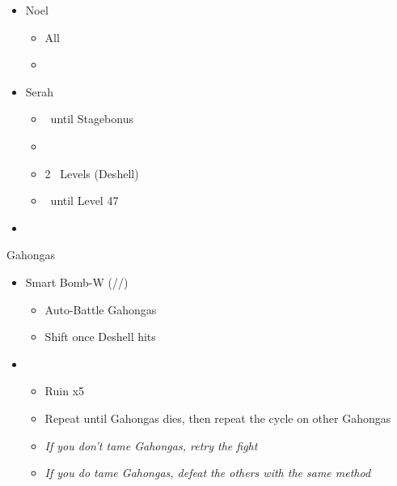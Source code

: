 


\begin{menu}
	\begin{itemize}
		\crystarium
		\begin{itemize}
			\item Noel
			      \begin{itemize}
				      \item All \rav
				      \item {}
			      \end{itemize}
			\item Serah
			      \begin{itemize}
				      \item \rav\ until Stagebonus
				      \item \stagebonus{\sab}
				      \item 2 \sab\ Levels (Deshell)
				      \item \rav\ until Level 47
			      \end{itemize}
		\end{itemize}
		\paradigm
		\begin{itemize}
			\item {}%
			      {\paradigmline{\com}{\com}{\nek}{\X}}%
			      {\paradigmline{\com}{\com}{\nek}{\W}}%
			      {\paradigmline[3]{\textit{\rav}}{\textit{(\sab)}}{\textit{\nek}}{\textit{\W}}}%
			      {\paradigmline{\sen}{\sen}{\nek}{\W}}%
			      {\paradigmline{\rav}{\rav}{\nek}{\W}}%
			      {\paradigmline{\rav}{\rav}{\nek}{\W}}
		\end{itemize}
	\end{itemize}
\end{menu}

\renewcommand{\third}{[3] Smart Bomb-W (\rav/\sab/\nek)}
\begin{battle}{Gahongas}
	\begin{itemize}
		\item \third
		      \begin{itemize}
			      \item Auto-Battle Gahongas
			      \item Shift once Deshell hits
		      \end{itemize}
		\item \first
		      \begin{itemize}
			      \item Ruin x5
			      \item Repeat until Gahongas dies, then repeat the cycle on other Gahongas
			      \item \textit{If you don't tame Gahongas, retry the fight}
			      \item \textit{If you do tame Gahongas, defeat the others with the same method}
		      \end{itemize}
	\end{itemize}
\end{battle}

